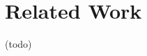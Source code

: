 \documentclass[10pt,a4paper]{article}
\begin{document}


\pagebreak

\pagebreak

\pagebreak

\pagebreak

\pagebreak
\section{Related Work}
(todo)
\printbibliography
\end{document}
